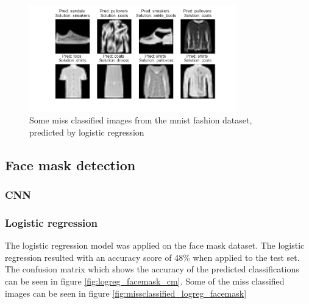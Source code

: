 \documentclass[../main.tex]{subfiles}
\begin{document}
\begin{figure}[H]
    \centering
    \includegraphics[width=0.8\textwidth]{doc/assets/logreg_missclassified_fasion.png}
    \caption{Some miss classified images from the mnist fashion dataset, predicted by logistic regression}
    \label{fig:missclassified_logreg_fashion}
\end{figure}

\subsection{Face mask detection}
\subsubsection{CNN}
\subsubsection{Logistic regression}
The logistic regression model was applied on the face mask dataset. The logistic regression resulted with an accuracy score of 48\% when applied to the test set. The confusion matrix which shows the accuracy of the predicted classifications can be seen in figure \ref{fig:logreg_facemask_cm}. Some of the miss classified images can be seen in figure \ref{fig:missclassified_logreg_facemask}
\end{document}
